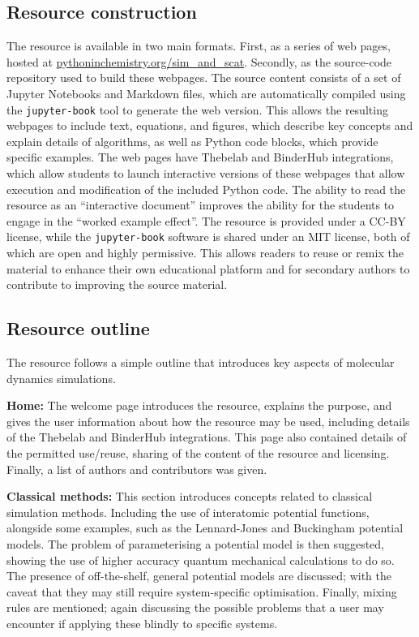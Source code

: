 \subsection{Resource construction}
The resource is available in two main formats.
First, as a series of web pages, hosted at \href{https://pythoninchemistry.org/sim_and_scat}{pythoninchemistry.org/sim\_and\_scat}.
Secondly, as the source-code repository used to build these webpages.\autocite{mccluskey_pythoninchemistry/sim_and_scat_2019}
The source content consists of a set of Jupyter Notebooks and Markdown files, which are automatically compiled using the \texttt{jupyter-book} tool\autocite{lau_jupyter/jupyter-book_2019} to generate the web version.
This allows the resulting webpages to include text, equations, and figures, which describe key concepts and explain details of algorithms, as well as Python code blocks, which provide specific examples.
The web pages have Thebelab and BinderHub integrations,\autocite{ragan-kelley_minrk/thebelab_2019, ragan-kelley_jupyterhub/binderhub_2019, jupyter_binder_2018} which allow students to launch interactive versions of these webpages that allow execution and modification of the included Python code.
The ability to read the resource as an ``interactive document'' improves the ability for the students to engage in the ``worked example effect''.\autocite{tarmizi_guidance_1988}
The resource is provided under a CC-BY license,\autocite{creative_commons_creative_2019} while the \texttt{jupyter-book} software is shared under an MIT license,\autocite{open_source_mit_2019} both of which are open and highly permissive.
This allows readers to reuse or remix the material to enhance their own educational platform and for secondary authors to contribute to improving the source material.

\subsection{Resource outline}
The resource follows a simple outline that introduces key aspects of molecular dynamics simulations.

\textbf{Home:} The welcome page introduces the resource, explains the purpose, and gives the user information about how the resource may be used, including details of the Thebelab and BinderHub integrations.
This page also contained details of the permitted use/reuse, sharing of the content of the resource and licensing.
Finally, a list of authors and contributors was given.

\textbf{Classical methods:} This section introduces concepts related to classical simulation methods.
Including the use of interatomic potential functions, alongside some examples, such as the Lennard-Jones and Buckingham potential models.\autocite{lennard-jones_determination_1924,buckingham_classical_1938}
The problem of parameterising a potential model is then suggested, showing the use of higher accuracy quantum mechanical calculations to do so.
The presence of off-the-shelf, general potential models are discussed; with the caveat that they may still require system-specific optimisation.
Finally, mixing rules are mentioned; again discussing the possible problems that a user may encounter if applying these blindly to specific systems.

